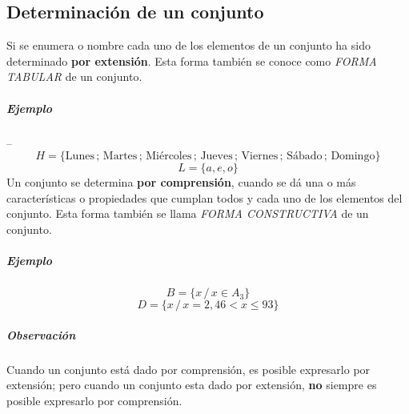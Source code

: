 \documentclass[10pt, twocolumn, landscape, a4paper]{article}
\begin{document}
\subsection*{Determinación de un conjunto}
Si se enumera o nombre cada uno de los elementos de un conjunto ha sido determinado \textbf{por extensión}. Esta forma también se conoce como \emph{FORMA TABULAR} de un conjunto.

\subparagraph*{Ejemplo} --
$$H = \{\text{Lunes}\,;\,\text{Martes}\,;\,\text{Miércoles}\,;\,\text{Jueves}\,;\,\text{Viernes}\,;\,\text{Sábado}\,;\,\text{Domingo}\}$$
$$L = \{a, e, o\}$$
Un conjunto se determina \textbf{por comprensión}, cuando se dá  una o más características o propiedades que cumplan todos y cada uno de los elementos del conjunto. Esta forma también se llama \emph{FORMA CONSTRUCTIVA} de un conjunto.

\subparagraph*{Ejemplo}
$$B = \{x\,/\,x \in A_{3}\}$$
$$D = \{x\,/\,x = 2, 46 < x \leq 93\}$$

\subparagraph*{Observación}
Cuando un conjunto está dado por comprensión, es posible expresarlo por extensión; pero cuando un conjunto esta dado por extensión, \textbf{no} siempre es posible expresarlo por comprensión.
\end{document}
